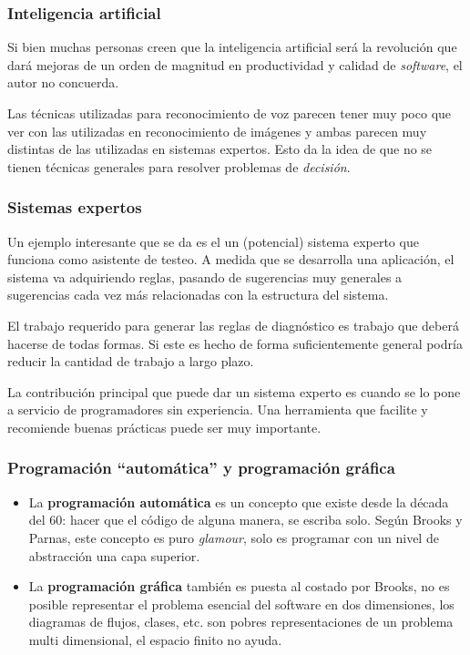 \documentclass{beamer}
\begin{document}
\begin{frame}[fragile]
  \frametitle{Inteligencia artificial}
  Si bien muchas personas creen que la inteligencia artificial ser\'a la
  revoluci\'on que dar\'a mejoras de un orden de magnitud en productividad
  y calidad de \textit{software}, el autor no concuerda.

  Las t\'ecnicas utilizadas para reconocimiento de voz parecen tener muy
  poco que ver con las utilizadas en reconocimiento de im\'agenes y ambas
  parecen muy distintas de las utilizadas en sistemas expertos.
  Esto da la idea de que no se tienen t\'ecnicas generales para resolver
  problemas de \textit{decisi\'on}.
\end{frame}


\begin{frame}[fragile]
  \frametitle{Sistemas expertos}

  Un ejemplo interesante que se da es el un (potencial) sistema experto que
  funciona como asistente de testeo.
  A medida que se desarrolla una aplicaci\'on, el sistema va adquiriendo reglas,
  pasando de sugerencias muy generales a sugerencias cada vez m\'as relacionadas
  con la estructura del sistema.

  El trabajo requerido para generar las reglas de diagn\'ostico es trabajo
  que deber\'a hacerse de todas formas. Si este es hecho de forma suficientemente
  general podr\'ia reducir la cantidad de trabajo a largo plazo.

  La contribuci\'on principal que puede dar un sistema experto es cuando se lo
  pone a servicio de programadores sin experiencia. Una herramienta que facilite
  y recomiende buenas pr\'acticas puede ser muy importante.
\end{frame}

\begin{frame}[fragile]
  \frametitle{Programaci\'on ``autom\'atica'' y programaci\'on gr\'afica}
  \begin{itemize}
    \item La \textbf{programaci\'on autom\'atica} es un concepto que existe desde la d\'ecada del 60:
  hacer que el c\'odigo de alguna manera, se escriba solo. Seg\'un Brooks y Parnas,
  este concepto es puro \textit{glamour}, solo es programar con un nivel de abstracci\'on
  una capa superior.

  \item La \textbf{programaci\'on gr\'afica} tambi\'en es puesta al costado por Brooks, no es posible
  representar el problema esencial del software en dos dimensiones, los diagramas
  de flujos, clases, etc. son pobres representaciones de un problema multi dimensional,
  el espacio finito no ayuda.
\end{itemize}
\end{frame}
\end{document}
